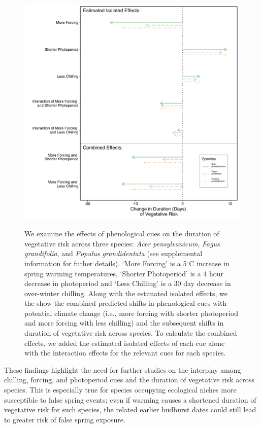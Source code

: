 \documentclass{article}\usepackage[]{graphicx}\usepackage[]{color}
\begin{document}
\begin{figure} [H] 
 \begin{center}
 \includegraphics[width=12cm, height=12cm]{..//figure/Exp_plotTPS.pdf} 
 \caption{We examine the effects of phenological cues on the duration of vegetative risk across three species: \textit{Acer pensylvanicum}, \textit{Fagus grandifolia}, and \textit{Populus grandidentata} (see supplemental information for futher details). `More Forcing' is a 5$^{\circ}$C increase in spring warming temperatures, `Shorter Photoperiod' is a 4 hour decrease in photoperiod and `Less Chilling' is a 30 day decrease in over-winter chilling. Along with the estimated isolated effects, we the show the combined predicted shifts in phenological cues with potential climate change (i.e., more forcing with shorter photoperiod and more forcing with less chilling) and the subsequent shifts in duration of vegetative risk across species. To calculate the combined effects, we added the estimated isolated effects of each cue alone with the interaction effects for the relevant cues for each species. }\label{fig:dan} 
 \end{center}
 \end{figure}

These findings highlight the need for further studies on the interplay among chilling, forcing, and photoperiod cues and the duration of vegetative risk across species. This is especially true for species occupying ecological niches more susceptible to false spring events; even if warming causes a shortened duration of vegetative risk for such species, the related earlier budburst dates could still lead to greater risk of false spring exposure.
\end{document}
